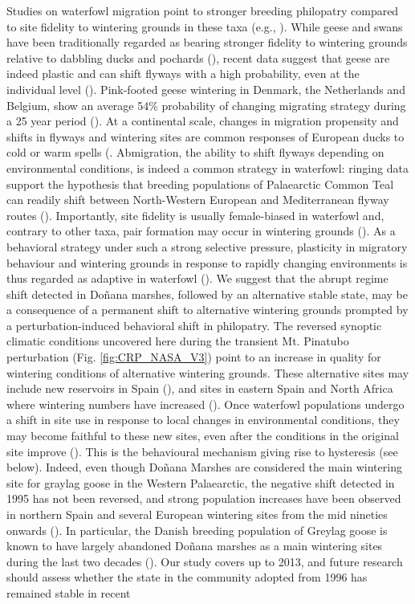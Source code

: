 \documentclass[12pt]{article}
\begin{document}
Studies on waterfowl migration point to stronger breeding philopatry compared to site fidelity to wintering grounds in these taxa (e.g., \cite{Guillemain2005,Davis2014,Clausen2016,Clausen2018a}). While geese and swans have been traditionally regarded as bearing stronger fidelity to wintering grounds relative to dabbling ducks and pochards (\cite{Robertson1999a,Coulson2016}), recent data suggest that geese are indeed plastic and can shift flyways with a high probability, even at the individual level (\cite{Clausen2016,Clausen2018a,Fox2023}). Pink-footed geese wintering in Denmark, the Netherlands and Belgium, show an average 54\% probability of changing migrating strategy during a 25 year period (\cite{Clausen2018a}). At a continental scale, changes in migration propensity and shifts in flyways and wintering sites are common responses of European ducks to cold or warm spells (\cite{Ridgill1990,Adam2015}. Abmigration, the ability to shift flyways depending on environmental conditions, is indeed a common strategy in waterfowl: ringing data support the hypothesis that breeding populations of Palaearctic Common Teal can readily shift between North-Western European and Mediterranean flyway routes (\cite{Guillemain2005,Parejo2015}). Importantly, site fidelity is usually female-biased in waterfowl and, contrary to other taxa, pair formation may occur in wintering grounds (\cite{Robertson1999a}). As a behavioral strategy under such a strong selective pressure, plasticity in migratory behaviour and wintering grounds in response to rapidly changing environments is thus regarded as adaptive in waterfowl (\cite{Clausen2016,Clausen2018a}). We suggest that the abrupt regime shift detected in Doñana marshes, followed by an alternative stable state, may be a consequence of a permanent shift to alternative wintering grounds prompted by a perturbation-induced behavioral shift in philopatry. The reversed synoptic climatic conditions uncovered here during the transient Mt. Pinatubo perturbation (Fig. \ref{fig:CRP_NASA_V3}) point to an increase in quality for wintering conditions of alternative wintering grounds. These alternative sites may include new reservoirs in Spain (\cite{Navedo2012}), and sites in eastern Spain and North Africa where wintering numbers have increased (\cite{Kleijn2014,DeArrudaAlmeida2019}). Once waterfowl populations undergo a shift in site use in response to local changes in environmental conditions, they may become faithful to these new sites, even after the conditions in the original site improve (\cite{Clausen2016,Clausen2018a}). This is the behavioural mechanism giving rise to hysteresis (see below). Indeed, even though Doñana Marshes are considered the main wintering site for graylag goose in the Western Palaearctic, the negative shift detected in 1995 has not been reversed, and strong population increases have been observed in northern Spain and several European wintering sites from the mid nineties onwards (\cite{Madsen1999,Ramo2015}). In particular, the Danish breeding population of Greylag goose is known to have largely abandoned Doñana marshes as a main wintering sites during the last two decades (\cite{Clausen2023}). Our study covers up to 2013, and future research should assess whether the state in the community adopted from 1996 has remained stable in recent 
\end{document}
